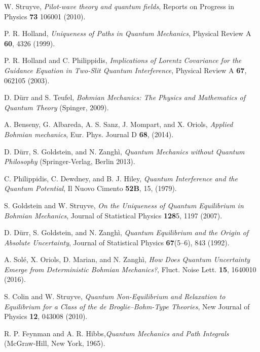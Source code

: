 \documentclass[nofootinbib, secnumarabic, amsmath, nobibnotes,10pt,aps,pra]{revtex4-1}
\begin{document}
\begin{thebibliography}{999}
W. Struyve, \emph{Pilot-wave theory and quantum fields}, Reports on Progress in Physics \textbf{73}  106001 (2010).  

P. R. Holland, \emph{Uniqueness of Paths in Quantum Mechanics}, Physical Review A \textbf{60}, 4326 (1999).

P. R. Holland and C. Philippidis, \emph{Implications of Lorentz Covariance for the Guidance Equation in Two-Slit Quantum Interference}, Physical Review A \textbf{67}, 062105 (2003).

D. D\"{u}rr and S. Teufel, \emph{Bohmian Mechanics: The Physics and Mathematics of Quantum Theory} (Spinger, 2009).

 A. Benseny, G. Albareda, A. S. Sanz, J. Mompart, and X. Oriols, \emph{Applied Bohmian mechanics}, Eur. Phys. Journal D \textbf{68},  (2014).

 D. D\"{u}rr, S. Goldstein, and N. Zangh\`i, \emph{Quantum Mechanics without Quantum Philosophy} (Springer-Verlag, Berlin 2013).

C. Philippidis, C. Dewdney, and B. J. Hiley, \emph{ Quantum Interference and the Quantum Potential},  Il Nuovo Cimento {\bf 52B},  15, (1979).

S. Goldstein and W. Struyve, \emph{On the Uniqueness of Quantum Equilibrium in Bohmian Mechanics}, Journal of Statistical Physics \textbf{128}5,  1197 (2007).

D. D\"{u}rr, S. Goldstein, and N. Zangh\`i, \emph{Quantum Equilibrium and the Origin of Absolute Uncertainty}, Journal of Statistical Physics \textbf{67}(5--6),  843 (1992).

  A. Sol\'e, X. Oriols, D. Marian, and N. Zangh\`i, \emph{How Does Quantum Uncertainty Emerge from Deterministic Bohmian Mechanics?}, Fluct. Noise Lett. \textbf{15},   1640010 (2016).

S. Colin and W. Struyve, \emph{Quantum Non-Equilibrium and Relaxation to Equilibrium for a Class of the de Broglie--Bohm-Type Theories}, New Journal of Physics \textbf{12},  043008 (2010).

R. P. Feynman and A. R. Hibbs,\emph{Quantum Mechanics and Path Integrals} (McGraw-Hill, New York, 1965).


\end{thebibliography}
\end{document}

